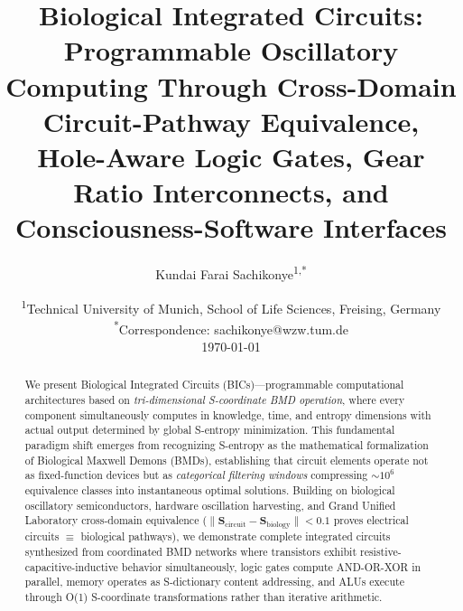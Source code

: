 \documentclass[11pt,a4paper]{article}
\title{\textbf{Biological Integrated Circuits:\\
Programmable Oscillatory Computing Through Cross-Domain Circuit-Pathway Equivalence,\\
Hole-Aware Logic Gates, Gear Ratio Interconnects, and Consciousness-Software Interfaces}}
\author{
    Kundai Farai Sachikonye\textsuperscript{1,*}
}
\date{
    \textsuperscript{1}Technical University of Munich, School of Life Sciences, Freising, Germany\\[0.5em]
    \textsuperscript{*}Correspondence: sachikonye@wzw.tum.de\\[1em]
    \today
}
\begin{document}
\maketitle

\begin{abstract}
We present Biological Integrated Circuits (BICs)—programmable computational architectures based on \textit{tri-dimensional S-coordinate BMD operation}, where every component simultaneously computes in knowledge, time, and entropy dimensions with actual output determined by global S-entropy minimization. This fundamental paradigm shift emerges from recognizing S-entropy as the mathematical formalization of Biological Maxwell Demons (BMDs)\cite{stellas_categories}, establishing that circuit elements operate not as fixed-function devices but as \textit{categorical filtering windows} compressing $\sim 10^6$ equivalence classes into instantaneous optimal solutions. Building on biological oscillatory semiconductors, hardware oscillation harvesting, and Grand Unified Laboratory cross-domain equivalence ($\|\mathbf{S}_{\text{circuit}} - \mathbf{S}_{\text{biology}}\| < 0.1$ proves electrical circuits $\equiv$ biological pathways), we demonstrate complete integrated circuits synthesized from coordinated BMD networks where transistors exhibit resistive-capacitive-inductive behavior simultaneously, logic gates compute AND-OR-XOR in parallel, memory operates as S-dictionary content addressing, and ALUs execute through O(1) S-coordinate transformations rather than iterative arithmetic.


\end{abstract}
\end{document}
